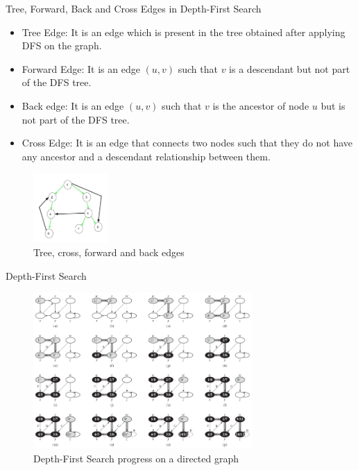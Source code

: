 \documentclass[ignorenonframetext,]{beamer}
\providecommand{\tightlist}{%
  \setlength{\itemsep}{0pt}\setlength{\parskip}{0pt}}
\begin{document}
\begin{frame}{Tree, Forward, Back and Cross Edges in Depth-First Search}
\protect\hypertarget{tree-forward-back-and-cross-edges-in-depth-first-search}{}

\begin{itemize}
\tightlist
\item
  Tree Edge: It is an edge which is present in the tree obtained after
  applying DFS on the graph.
\item
  Forward Edge: It is an edge \((u, v)\) such that \(v\) is a descendant
  but not part of the DFS tree.
\item
  Back edge: It is an edge \((u, v)\) such that \(v\) is the ancestor of
  node \(u\) but is not part of the DFS tree.
\item
  Cross Edge: It is an edge that connects two nodes such that they do
  not have any ancestor and a descendant relationship between them.
\end{itemize}

\begin{figure}
\centering
\includegraphics[width=\textwidth,height=1.04167in]{tree-forward-back-and-cross-edges.jpg}
\caption{Tree, cross, forward and back edges}
\end{figure}

\end{frame}

\begin{frame}{Depth-First Search}
\protect\hypertarget{depth-first-search-1}{}

\begin{figure}
\centering
\includegraphics[width=\textwidth,height=2.34375in]{progress-dfs-directed-graph.png}
\caption{Depth-First Search progress on a directed graph}
\end{figure}

\end{frame}
\end{document}
